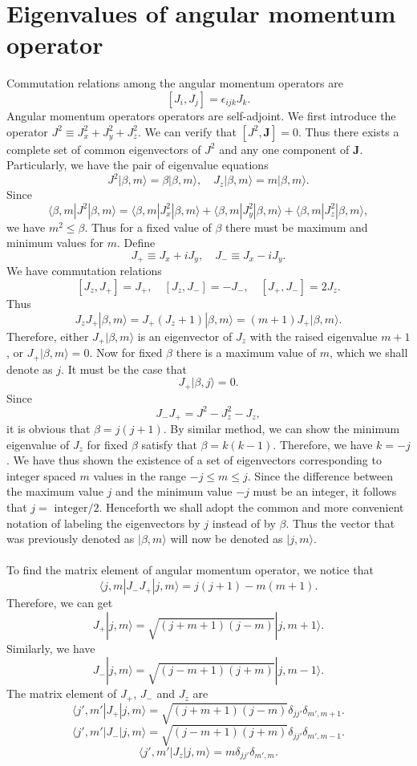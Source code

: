\section{Eigenvalues of angular momentum operator}
Commutation relations among the angular momentum operators are
\[[J_i,J_j] = \epsilon_{ijk} J_k.\]
Angular momentum operators operators are self-adjoint. 
We first introduce the operator $J^2 \equiv J_x^2 + J_y^2 + J_z^2$. We can verify that $[J^2,\bm{J}] = 0$. Thus there exists a complete set of common eigenvectors of $J^2$ and any one component of $\bm{J}$. Particularly, we have the pair of eigenvalue equations
\[J^2 | \beta,m\rangle = \beta | \beta,m\rangle , \quad J_z | \beta,m\rangle = m | \beta,m\rangle.\]
Since
\[\langle \beta,m | J^2 | \beta,m \rangle = \langle \beta,m | J_x^2 | \beta,m \rangle + \langle \beta,m | J_y^2 | \beta,m \rangle + \langle \beta,m | J_z^2 | \beta,m \rangle,\]
we have $m^2 \leq \beta$. Thus for a fixed value of $\beta$ there must be maximum and minimum values for $m$.
Define
\[J_+ \equiv J_x + iJ_y , \quad J_- \equiv J_x - iJ_y.\]
We have commutation relations
\[[J_z,J_+] = J_+ , \quad [J_z,J_-] = -J_- , \quad [J_+,J_-] = 2J_z.\]
Thus
\[J_z J_+ | \beta,m\rangle = J_+(J_z + 1)| \beta,m\rangle = (m+1)J_+| \beta,m\rangle.\]
Therefore, either $J_+ | \beta,m\rangle$ is an eigenvector of $J_z$ with the raised eigenvalue $m+1$, or $J_+ | \beta,m\rangle = 0$. Now for fixed $\beta$ there is a maximum value of $m$, which we shall denote as $j$. It must be the case that
\[J_+ |\beta,j\rangle = 0.\]
Since
\[J_- J_+ = J^2 - J_z^2 - J_z,\]
it is obvious that $\beta = j(j+1)$. By similar method, we can show the minimum eigenvalue of $J_z$ for fixed $\beta$ satisfy that $\beta = k(k-1)$. Therefore, we have $k = -j$.
We have thus shown the existence of a set of eigenvectors corresponding to integer spaced $m$ values in the range $-j \leq m \leq j$. Since the difference between the maximum value $j$ and the minimum value $-j$ must be an integer, it follows that $j = \mbox{ integer} / 2$. Henceforth we shall adopt the common and more convenient notation of labeling the eigenvectors by $j$ instead of by $\beta$. Thus the vector that was previously denoted as $|\beta,m\rangle$ will now be denoted as $|j,m\rangle$. 
\\ \\
To find the matrix element of angular momentum operator, we notice that
\[\langle j,m| J_-J_+|j,m\rangle = j(j+1)-m(m+1).\]
Therefore, we can get
\[J_+ |j,m\rangle = \sqrt{(j+m+1)(j-m)} |j,m+1\rangle.\]
Similarly, we have
\[J_- |j,m\rangle = \sqrt{(j-m+1)(j+m)} |j,m-1\rangle.\]
The matrix element of $J_+$, $J_-$ and $J_z$ are
\[\langle j',m'| J_+ | j,m\rangle = \sqrt{(j+m+1)(j-m)} \delta_{jj'}\delta_{m',m+1}.\]
\[\langle j',m'| J_- | j,m\rangle = \sqrt{(j-m+1)(j+m)} \delta_{jj'}\delta_{m',m-1}.\]
\[\langle j',m'| J_z | j,m\rangle = m \delta_{jj'}\delta_{m',m}.\]

